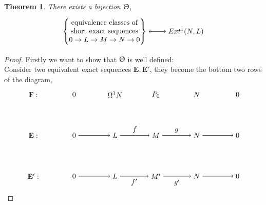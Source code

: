 \documentclass[11.5pt, twoside, a4paper, titlepage]{report}
\makeatletter
\theoremstyle{definition}
\theoremstyle{plain}
\newtheorem{thm}[mydef]{Theorem}
\newcommand{\mytab}[1]{%
\begin{tabular}{@{}c@{}}
#1
\end{tabular}
}
\makeatother
\begin{document}
\begin{thm} 
There exists a bijection $\Uptheta$,
\begin{equation*}
\begin{tikzpicture}[->,-latex, auto, main path/.style={->, semithick}, main node/.style={}]
\node [main node] 	(1) at (0,0)		{$\left\{\mytab{equivalence classes of\\ short exact sequences\\ $0\to L \to M \to N \to 0$}\right\}$};
\node [main node]			(2) at (4,0)		{$Ext^1(N,L)$};

\draw (1) edge  [<->, semithick] (2);
\end{tikzpicture}
\end{equation*}
\end{thm}
\begin{proof}
Firstly we want to show that $\Uptheta$ is well defined:\\
Consider two equivalent exact sequences $\mathbf{E}, \mathbf{E'}$, they become the bottom two rows of the diagram, 
\begin{equation*}
\begin{tikzpicture}[->,-latex, auto, main path/.style={->, semithick}, main node/.style={}]
\node [main node]		(1) at (0,0)		{$\mathbf{E}:$};
\node	[main node]		(2) at (2,0)		{$0$};
\node	[main node]		(3) at (4,0)		{$L$};
\node [main node]		(4) at (6,0)		{$M$};
\node [main node]		(5) at (8,0)		{$N$};
\node	[main node]		(11) at (10,0)	{$0$};

\node [main node] 		(6) at (0,-2)		{$\mathbf{E'}:$};
\node	[main node]		(7) at (2,-2)		{$0$};
\node	[main node]		(8) at (4,-2)		{$L$};
\node [main node]		(9) at (6,-2)		{$M'$};
\node [main node]		(10) at (8,-2)	{$N$};
\node [main node]		(13) at (10,-2)	{$0$};

\node [main node] 		(14) at (0,2)		{$\mathbf{F}:$};
\node	[main node]		(15) at (2,2)		{$0$};
\node	[main node]		(16) at (4,2)		{$\Omega^1N$};
\node [main node]		(17) at (6,2)		{$P_0$};
\node [main node]		(18) at (8,2)		{$N$};
\node [main node]		(19) at (10,2)	{$0$};

\draw (2) edge [main path] node [auto] {$$} (3);
\draw (3) edge [main path] node [auto] {$f$} (4);
\draw (4) edge [main path] node [auto] {$g$} (5);
\draw (5) edge [main path] node [auto] {$$} (11);

\draw (7) edge [main path] node [auto] {$$} (8);
\path (8) edge [main path] node [auto, swap] {$f'$} (9);
\draw (9) edge [main path] node [auto, swap] {$g'$} (10);
\draw (10) edge [main path] node [auto, swap] {$$} (13);


\end{tikzpicture}
\end{equation*}
\end{proof}
\end{document}

